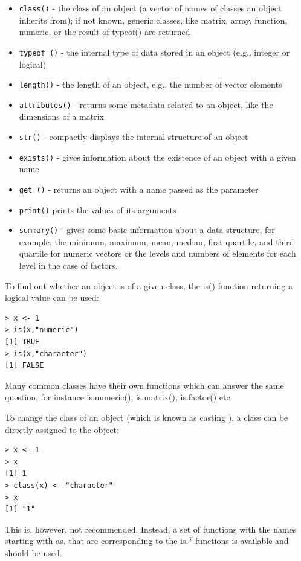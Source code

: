 \documentclass[11pt,openany,executivepaper]{book}
\begin{document}
\begin{itemize}
  \item \texttt{class()} - the class of an object (a vector of names of classes an object inherits from); if not known, generic classes, like matrix, array, function, numeric, or the result of typeof() are returned
  \item \texttt{typeof ()} - the internal type of data stored in an object (e.g., integer or logical)
  \item \texttt{length()} - the length of an object, e.g., the number of vector elements
  \item \texttt{attributes()} - returns some metadata related to an object, like the dimensions of a matrix
  \item \texttt{str()} - compactly displays the internal structure of an object
  \item \texttt{exists()} - gives information about the existence of an object with a given name
  \item \texttt{get ()} - returns an object with a name passed as the parameter
  \item \texttt{print()}-prints the values of its arguments
  \item \texttt{summary()} - gives some basic information about a data structure, for example, the minimum, maximum, mean, median, first quartile, and third quartile for numeric vectors or the levels and numbers of elements for each level in the case of factors.
\end{itemize}

To find out whether an object is of a given class, the is() function returning a logical value can be used:

\begin{verbatim}
> x <- 1
> is(x,"numeric")
[1] TRUE
> is(x,"character")
[1] FALSE
\end{verbatim}

Many common classes have their own functions which can answer the same question, for instance is.numeric(), is.matrix(), is.factor() etc.

To change the class of an object (which is known as casting \cite{58}), a class can be directly assigned to the object:

\begin{verbatim}
> x <- 1
> x
[1] 1
> class(x) <- "character"
> x
[1] "1"
\end{verbatim}

This is, however, not recommended. Instead, a set of functions with the names starting with as. that are corresponding to the is.* functions is available and should be used.
\end{document}
